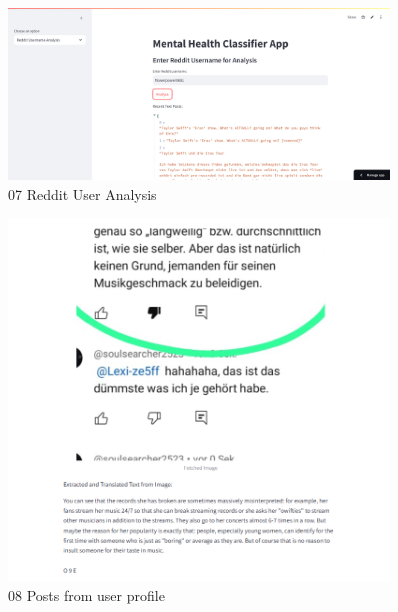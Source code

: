 \begin{figure}[h!]  
    \centering
    \includegraphics[width=0.9\textwidth]{App Images/07 Interface.png}  
    \caption{07 Reddit User Analysis}
    \label{07i}  %
\end{figure}

\begin{figure}[h!]  
    \centering
    \includegraphics[width=0.9\textwidth]{App Images/08 Interface.png}  
    \caption{08 Posts from user profile}
    \label{08i}  %
\end{figure}


